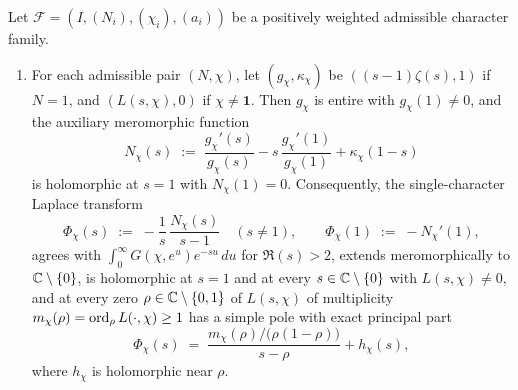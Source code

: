 \begin{proposition}
\label{prop:02:pole-data}
Let $\mathcal{F} = (I, (N_i), (\chi_i), (a_i))$ be a positively weighted admissible character family.
\begin{enumerate}[label=\textup{(\roman*)}]
\item For each admissible pair $(N, \chi)$, let $(g_\chi, \kappa_\chi)$ be $((s-1)\zeta(s), 1)$ if $N=1$, and $(L(s,\chi), 0)$ if $\chi \neq \mathbf{1}$. Then $g_\chi$ is entire with $g_\chi(1) \neq 0$, and the auxiliary meromorphic function
  \begin{equation}
  \label{eq:02:nchi-def}
    N_\chi(s) \;:=\; \frac{g_\chi'(s)}{g_\chi(s)} - s\,\frac{g_\chi'(1)}{g_\chi(1)} + \kappa_\chi(1 - s)
  \end{equation}
  is holomorphic at $s = 1$ with $N_\chi(1) = 0$. Consequently, the single-character Laplace transform
  \begin{equation}
  \label{eq:02:phichi-def}
    \Phi_\chi(s) \;:=\; -\frac{1}{s}\,\frac{N_\chi(s)}{s-1} \quad (s \neq 1), \qquad \Phi_\chi(1) \;:=\; -N_\chi'(1),
  \end{equation}
  agrees with $\int_0^\infty G(\chi, e^u) e^{-su}\,du$ for $\Re(s) > 2$, extends meromorphically to $\mathbb{C} \setminus \{0\}$, is holomorphic at $s = 1$ and at every $s \in \mathbb{C} \setminus \{0\}$ with $L(s, \chi) \neq 0$, and at every zero $\rho \in \mathbb{C} \setminus \{0, 1\}$ of $L(s, \chi)$ of multiplicity $m_\chi(\rho) = \operatorname{ord}_\rho L(\cdot, \chi) \ge 1$ has a simple pole with exact principal part
  \[
    \Phi_\chi(s) \;=\; \frac{m_\chi(\rho)/\bigl(\rho(1-\rho)\bigr)}{s - \rho} + h_\chi(s),
  \]
  where $h_\chi$ is holomorphic near $\rho$.


\end{enumerate}
\end{proposition}
